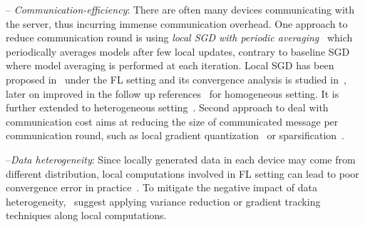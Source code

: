 \documentclass[11pt]{article}
\begin{document}
-- \emph{Communication-efficiency}: There are often many devices communicating with the server, thus incurring immense communication overhead. 
One approach to reduce communication round is using \emph{local SGD with periodic averaging}~\citep{zhou2018convergence,stich2019local,yu2019parallel,wang2018cooperative} which periodically averages models after few local updates, contrary to baseline SGD~\citep{bottou-bousquet-2008} where model averaging is performed at each iteration.
Local SGD has been proposed in~\citet{mcmahan2016communication,konevcny2016federated} under the FL setting and its convergence analysis is studied in~\citet{stich2019local,wang2018cooperative,zhou2018convergence,yu2019parallel}, later on improved in the follow up references~\citep{basu2019qsparse,haddadpour2019convergence,bayoumi2020tighter,stich2019error} for homogeneous setting. 
It is further extended to heterogeneous setting~\citep{yu2019linear,li2019convergence,sahu2018convergence,liang2019variance,haddadpour2019convergence,karimireddy2019scaffold}. Second approach to deal with communication cost aims at reducing the size of communicated message per communication round, such as local gradient quantization~\citep{alistarh2017qsgd,bernstein2018signsgd,tang2018communication,wen2017terngrad,wu2018error} or sparsification~\citep{alistarh2018convergence,lin2017deep,stich2018sparsified,stich2019error}. 


--\emph{Data heterogeneity}: 
Since locally generated data in each device may come from different distribution, local computations involved in FL setting can lead to poor convergence error in practice~\citep{li2019federated,liang2019variance}. 
To mitigate the negative impact of data heterogeneity,~\citep{haddadpour2020federated,horvath2019stochastic,liang2019variance,karimireddy2019scaffold} suggest applying variance reduction or gradient tracking techniques along local computations.
\end{document}
